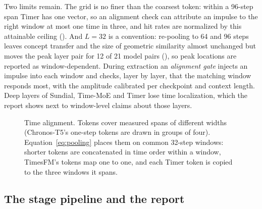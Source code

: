 Two limits remain. The grid is no finer than the coarsest token: within a 96-step span Timer has one vector, so an
alignment check can attribute an impulse to the right window at most one time in three, and hit rates are normalized by
this attainable ceiling (). And $L=32$ is a convention: re-pooling to 64 and 96 steps leaves concept transfer
and the size of geometric similarity almost unchanged but moves the peak layer pair for 12 of 21 model pairs
(), so peak locations are reported as window-dependent. During extraction an \emph{alignment gate} injects an
impulse into each window and checks, layer by layer, that the matching window responds most, with the amplitude
calibrated per checkpoint and context length. Deep layers of Sundial, Time-MoE and Timer lose time localization, which
the report shows next to window-level claims about those layers.

\begin{figure}[!tb]
\centering
{}
\caption{Time alignment. Tokens cover measured spans of different widths (Chronos-T5's one-step tokens are drawn
in groups of four). Equation~\eqref{eq:pooling} places them on common 32-step windows: shorter tokens are concatenated
in time order within a window, TimesFM's tokens map one to one, and each Timer token is copied to the three windows it
spans.}
\label{fig:alignment}
\end{figure}

\subsection{The stage pipeline and the report}
\label{sec:stages}
\label{sec:report}

